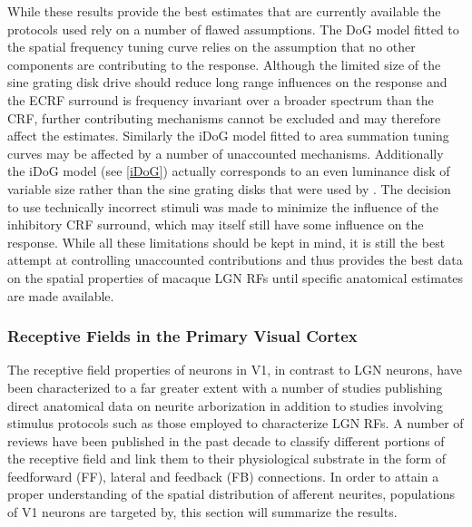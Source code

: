While these results provide the best estimates that are currently
available the protocols used rely on a number of flawed
assumptions. The DoG model fitted to the spatial frequency tuning
curve relies on the assumption that no other components are
contributing to the response. Although the limited size of the sine
grating disk drive should reduce long range influences on the response
and the ECRF surround is frequency invariant over a broader spectrum
than the CRF, further contributing mechanisms cannot be excluded and
may therefore affect the estimates. Similarly the iDoG model fitted to
area summation tuning curves may be affected by a number of
unaccounted mechanisms. Additionally the iDoG model (see \ref{iDoG})
actually corresponds to an even luminance disk of variable size rather
than the sine grating disks that were used by \cite{Sceniak2006}. The
decision to use technically incorrect stimuli was made to minimize the
influence of the inhibitory CRF surround, which may itself still have
some influence on the response.  While all these limitations should be
kept in mind, it is still the best attempt at controlling unaccounted
contributions and thus provides the best data on the spatial
properties of macaque LGN RFs until specific anatomical estimates are
made available.

\subsubsection{Receptive Fields in the Primary Visual Cortex}

The receptive field properties of neurons in V1, in contrast to LGN
neurons, have been characterized to a far greater extent with a number
of studies publishing direct anatomical data on neurite arborization
in addition to studies involving stimulus protocols such as those
employed to characterize LGN RFs. A number of reviews have been
published in the past decade to classify different portions of the
receptive field and link them to their physiological substrate in the
form of feedforward (FF), lateral and feedback (FB) connections. In
order to attain a proper understanding of the spatial distribution of
afferent neurites, populations of V1 neurons are targeted by, this
section will summarize the results.

